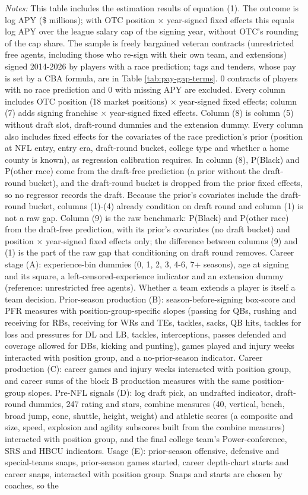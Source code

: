 {\footnotesize
\noindent\textit{Notes:} This table includes the estimation results of equation (1). The outcome is log APY (\$ millions); with OTC position $\times$ year-signed fixed effects this equals log APY over the league salary cap of the signing year, without OTC's rounding of the cap share. The sample is freely bargained veteran contracts (unrestricted free agents, including those who re-sign with their own team, and extensions) signed 2014-2026 by players with a race prediction; tags and tenders, whose pay is set by a CBA formula, are in Table \ref{tab:pay-gap-terms}. 0 contracts of players with no race prediction and 0 with missing APY are excluded. Every column includes OTC position (18 market positions) $\times$ year-signed fixed effects; column (7) adds signing franchise $\times$ year-signed fixed effects. Column (8) is column (5) without draft slot, draft-round dummies and the extension dummy. Every column also includes fixed effects for the covariates of the race prediction's prior (position at NFL entry, entry era, draft-round bucket, college type and whether a home county is known), as regression calibration requires. In column (8), P(Black) and P(other race) come from the draft-free prediction (a prior without the draft-round bucket), and the draft-round bucket is dropped from the prior fixed effects, so no regressor records the draft. Because the prior's covariates include the draft-round bucket, columns (1)-(4) already condition on draft round and column (1) is not a raw gap. Column (9) is the raw benchmark: P(Black) and P(other race) from the draft-free prediction, with its prior's covariates (no draft bucket) and position $\times$ year-signed fixed effects only; the difference between columns (9) and (1) is the part of the raw gap that conditioning on draft round removes. Career stage (A): experience-bin dummies (0, 1, 2, 3, 4-6, 7+ seasons), age at signing and its square, a left-censored-experience indicator and an extension dummy (reference: unrestricted free agents). Whether a team extends a player is itself a team decision. Prior-season production (B): season-before-signing box-score and PFR measures with position-group-specific slopes (passing for QBs, rushing and receiving for RBs, receiving for WRs and TEs, tackles, sacks, QB hits, tackles for loss and pressures for DL and LB, tackles, interceptions, passes defended and coverage allowed for DBs, kicking and punting), games played and injury weeks interacted with position group, and a no-prior-season indicator. Career production (C): career games and injury weeks interacted with position group, and career sums of the block B production measures with the same position-group slopes. Pre-NFL signals (D): log draft pick, an undrafted indicator, draft-round dummies, 247 rating and stars, combine measures (40, vertical, bench, broad jump, cone, shuttle, height, weight) and athletic scores (a composite and size, speed, explosion and agility subscores built from the combine measures) interacted with position group, and the final college team's Power-conference, SRS and HBCU indicators. Usage (E): prior-season offensive, defensive and special-teams snaps, prior-season games started, career depth-chart starts and career snaps, interacted with position group. Snaps and starts are chosen by coaches, so the }
